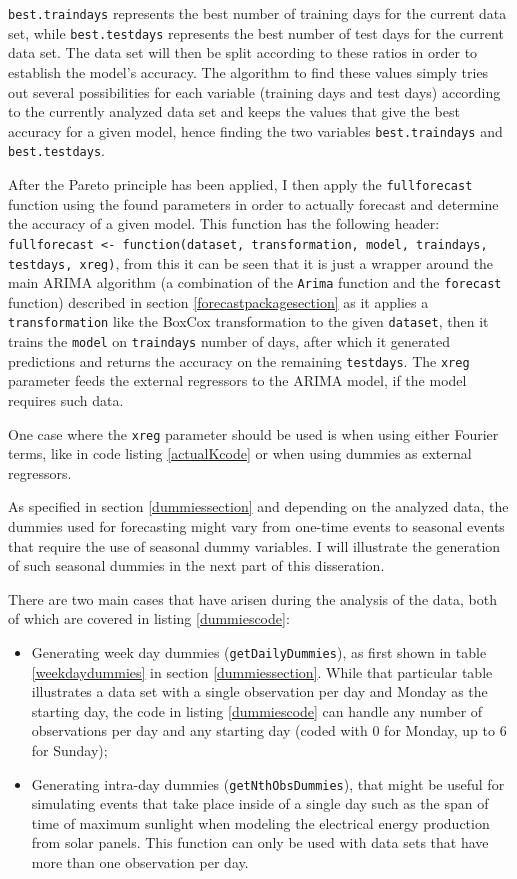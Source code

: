 \documentclass[12pt,a4paper,titlepage]{report}
\begin{document}
\texttt{best.traindays} represents the best number of training days for the current data set, while \texttt{best.testdays} represents the best number of test days for the current data set.
The data set will then be split according to these ratios in order to establish the model's accuracy.
The algorithm to find these values simply tries out several possibilities for each variable (training days and test days) according to the currently analyzed data set and keeps the values that give the best accuracy for a given model, hence finding the two variables \texttt{best.traindays} and \texttt{best.testdays}.

After the Pareto principle has been applied, I then apply the \texttt{fullforecast} function using the found parameters in order to actually forecast and determine the accuracy of a given model. This function has the following header: \texttt{fullforecast <- function(dataset, transformation, model, traindays, testdays, xreg)}, from this it can be seen that it is just a wrapper around the main ARIMA algorithm (a combination of the \texttt{Arima} function and the \texttt{forecast} function) described in section \ref{forecastpackagesection} as it applies a \texttt{transformation} like the BoxCox transformation to the given \texttt{dataset}, then it trains the \texttt{model} on \texttt{traindays} number of days, after which it generated predictions and returns the accuracy on the remaining \texttt{testdays}. The \texttt{xreg} parameter feeds the external regressors to the ARIMA model, if the model requires such data.

One case where the \texttt{xreg} parameter should be used is when using either Fourier terms, like in code listing \ref{actualKcode} or when using dummies as external regressors.

As specified in section \ref{dummiessection} and depending on the analyzed data, the dummies used for forecasting might vary from one-time events to seasonal events that require the use of seasonal dummy variables. I will illustrate the generation of such seasonal dummies in the next part of this disseration.

There are two main cases that have arisen during the analysis of the data, both of which are covered in listing \ref{dummiescode}:
\begin{itemize}
    \item Generating week day dummies (\texttt{getDailyDummies}), as first shown in table \ref{weekdaydummies} in section \ref{dummiessection}. While that particular table illustrates a data set with a single observation per day and Monday as the starting day, the code in listing \ref{dummiescode} can handle any number of observations per day and any starting day (coded with 0 for Monday, up to 6 for Sunday);
    \item Generating intra-day dummies (\texttt{getNthObsDummies}), that might be useful for simulating events that take place inside of a single day such as the span of time of maximum sunlight when modeling the electrical energy production from solar panels. This function can only be used with data sets that have more than one observation per day.
\end{itemize}
\end{document}
